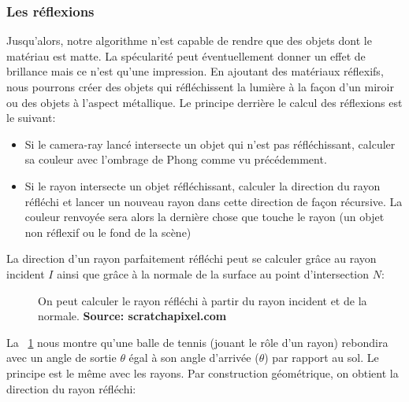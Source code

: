 \documentclass[11pt]{article}
\begin{document}
\subsubsection{Les réflexions}
\label{reflexions}

Jusqu'alors, notre algorithme n'est capable de rendre que des objets dont le matériau est matte. La spécularité peut éventuellement donner un effet de brillance mais ce n'est qu'une impression. En ajoutant des matériaux réflexifs, nous pourrons créer des objets qui réfléchissent la lumière à la façon d'un miroir ou des objets à l'aspect métallique. Le principe derrière le calcul des réflexions est le suivant:
\begin{itemize}
	\item{Si le camera-ray lancé intersecte un objet qui n'est pas réfléchissant, calculer sa couleur avec l'ombrage de Phong comme vu précédemment.}
	\item{Si le rayon intersecte un objet réfléchissant, calculer la direction du rayon réfléchi et lancer un nouveau rayon dans cette direction de façon récursive. La couleur renvoyée sera alors la dernière chose que touche le rayon (un objet non réflexif ou le fond de la scène)}
\end{itemize}
La direction d'un rayon parfaitement réfléchi peut se calculer grâce au rayon incident $I$ ainsi que grâce à la normale de la surface au point d'intersection $N$:

\begin{figure}[h!]

	\caption{On peut calculer le rayon réfléchi à partir du rayon incident et de la normale. \textbf{Source: scratchapixel.com}}
	\label{reflectionCalcul}
\end{figure}
\FloatBarrier

La \figurename\ \ref{reflectionCalcul} nous montre qu'une balle de tennis (jouant le rôle d'un rayon) rebondira avec un angle de sortie $\theta$ égal à son angle d'arrivée ($\theta$) par rapport au sol. Le principe est le même avec les rayons. Par construction géométrique, on obtient la direction du rayon réfléchi:
\end{document}
